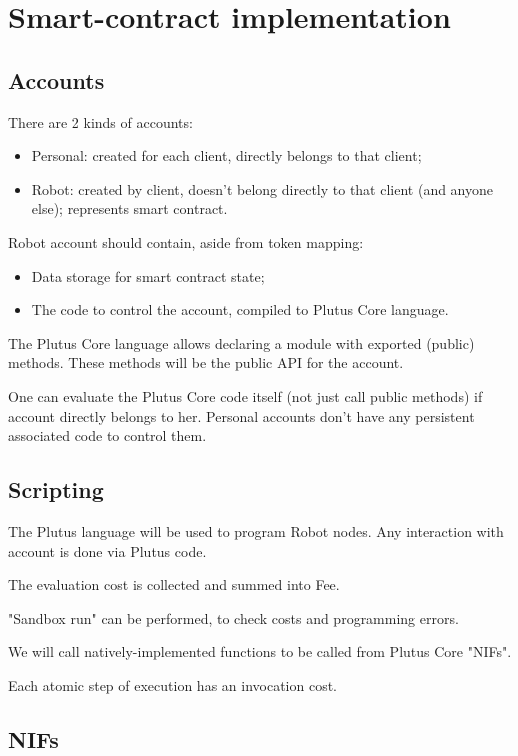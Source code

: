 \appendix

\section{Smart-contract implementation}

\subsection{Accounts}

There are 2 kinds of accounts:
\begin{itemize}
  \item Personal: created for each client, directly belongs to that client;
  \item Robot: created by client, doesn't belong directly to that client (and anyone else); represents smart contract.
\end{itemize}

Robot account should contain, aside from token mapping:
\begin{itemize}
  \item Data storage for smart contract state;
  \item The code to control the account, compiled to Plutus Core language.
\end{itemize}

The Plutus Core language allows declaring a module with exported (public) methods.
These methods will be the public API for the account.

One can evaluate the Plutus Core code itself (not just call public methods) if account directly belongs to her.
Personal accounts don't have any persistent associated code to control them.

\subsection{Scripting}

The Plutus language will be used to program Robot nodes.
Any interaction with account is done via Plutus code.

The evaluation cost is collected and summed into Fee.

"Sandbox run" can be performed, to check costs and programming errors.

We will call natively-implemented functions to be called from Plutus Core "NIFs".

Each atomic step of execution has an invocation cost.

\subsection{NIFs}

